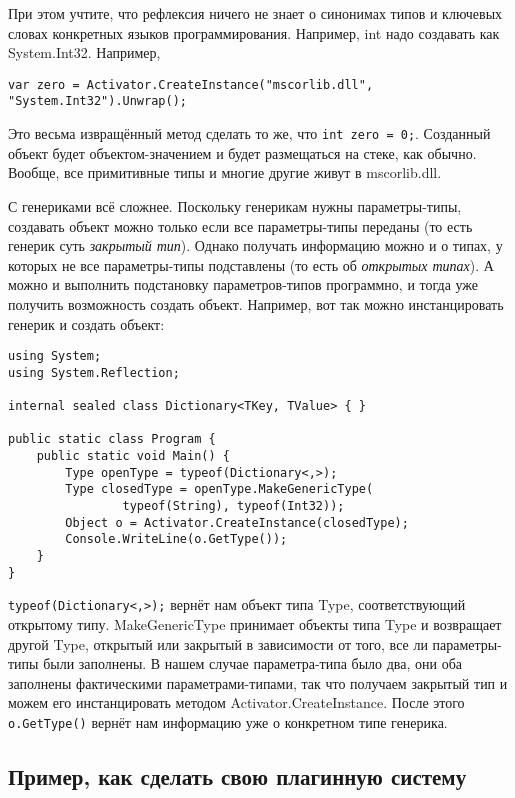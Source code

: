 \documentclass{../../text-style}
\begin{document}
При этом учтите, что рефлексия ничего не знает о синонимах типов и ключевых словах конкретных языков программирования. Например, int надо создавать как System.Int32. Например, 

\begin{verbatim}
var zero = Activator.CreateInstance("mscorlib.dll", "System.Int32").Unwrap();
\end{verbatim}

Это весьма извращённый метод сделать то же, что \texttt{int zero = 0;}. Созданный объект будет объектом-значением и будет размещаться на стеке, как обычно. Вообще, все примитивные типы и многие другие живут в mscorlib.dll.

С генериками всё сложнее. Поскольку генерикам нужны параметры-типы, создавать объект можно только если все параметры-типы переданы (то есть генерик суть \textit{закрытый тип}). Однако получать информацию можно и о типах, у которых не все параметры-типы подставлены (то есть об \textit{открытых типах}). А можно и выполнить подстановку параметров-типов программно, и тогда уже получить возможность создать объект. Например, вот так можно инстанцировать генерик и создать объект:

\begin{verbatim}
using System;
using System.Reflection;

internal sealed class Dictionary<TKey, TValue> { }

public static class Program {
    public static void Main() {
        Type openType = typeof(Dictionary<,>);
        Type closedType = openType.MakeGenericType(
                typeof(String), typeof(Int32));
        Object o = Activator.CreateInstance(closedType);
        Console.WriteLine(o.GetType());
    }
}
\end{verbatim}

\texttt{typeof(Dictionary<,>);} вернёт нам объект типа Type, соответствующий открытому типу. MakeGenericType принимает объекты типа Type и возвращает другой Type, открытый или закрытый в зависимости от того, все ли параметры-типы были заполнены. В нашем случае параметра-типа было два, они оба заполнены фактическими параметрами-типами, так что получаем закрытый тип и можем его инстанцировать методом Activator.CreateInstance. После этого \texttt{o.GetType()} вернёт нам информацию уже о конкретном типе генерика.

\subsection{Пример, как сделать свою плагинную систему}
\end{document}
